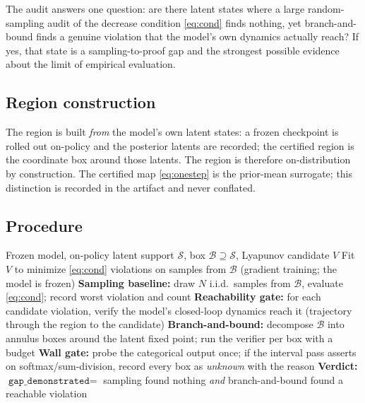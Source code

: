 \documentclass[journal]{IEEEtran}
\begin{document}
The audit answers one question: are there latent states where a large
random-sampling audit of the decrease condition \eqref{eq:cond} finds
nothing, yet branch-and-bound finds a genuine violation that the model's own
dynamics actually reach? If yes, that state is a sampling-to-proof gap and
the strongest possible evidence about the limit of empirical evaluation.

\subsection{Region construction}

The region is built \emph{from} the model's own latent states: a frozen
checkpoint is rolled out on-policy and the posterior latents are recorded;
the certified region is the coordinate box around those latents. The region
is therefore on-distribution by construction. The certified map
\eqref{eq:onestep} is the prior-mean surrogate; this distinction is recorded
in the artifact and never conflated.

\subsection{Procedure}

\begin{algorithm}[t]
\caption{Sampling-to-proof gap audit}
\begin{algorithmic}[1]
\Require Frozen model, on-policy latent support $\mathcal{S}$, box
$\mathcal{B} \supseteq \mathcal{S}$, Lyapunov candidate $V$
\State Fit $V$ to minimize \eqref{eq:cond} violations on samples from
$\mathcal{B}$ (gradient training; the model is frozen)
\State \textbf{Sampling baseline:} draw $N$ i.i.d.\ samples from
$\mathcal{B}$, evaluate \eqref{eq:cond}; record worst violation and count
\State \textbf{Reachability gate:} for each candidate violation, verify the
model's closed-loop dynamics reach it (trajectory through the region to the
candidate)
\State \textbf{Branch-and-bound:} decompose $\mathcal{B}$ into annulus boxes
around the latent fixed point; run the verifier per box with a budget
\State \textbf{Wall gate:} probe the categorical output once; if the interval
pass asserts on softmax/sum-division, record every box as \emph{unknown} with
the reason
\State \textbf{Verdict:} $\texttt{gap\_demonstrated} = $ sampling found
nothing \emph{and} branch-and-bound found a reachable violation
\end{algorithmic}
\end{algorithm}
\end{document}
